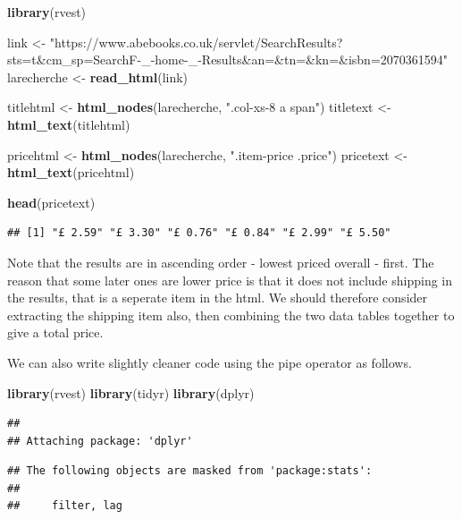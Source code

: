 \documentclass[]{book}
\newenvironment{Shaded}{\begin{snugshade}}{\end{snugshade}}
\newcommand{\KeywordTok}[1]{\textcolor[rgb]{0.13,0.29,0.53}{\textbf{#1}}}
\newcommand{\StringTok}[1]{\textcolor[rgb]{0.31,0.60,0.02}{#1}}
\newcommand{\NormalTok}[1]{#1}
\theoremstyle{definition}
\theoremstyle{definition}
\theoremstyle{definition}
\theoremstyle{remark}
\begin{document}
\begin{Shaded}
\begin{Highlighting}[]
\KeywordTok{library}\NormalTok{(rvest)}

\NormalTok{link <-}\StringTok{ "https://www.abebooks.co.uk/servlet/SearchResults?sts=t&cm_sp=SearchF-_-home-_-Results&an=&tn=&kn=&isbn=2070361594"}
\NormalTok{larecherche <-}\StringTok{ }\KeywordTok{read_html}\NormalTok{(link)}

\NormalTok{titlehtml <-}\StringTok{ }\KeywordTok{html_nodes}\NormalTok{(larecherche, }\StringTok{".col-xs-8 a span"}\NormalTok{)}
\NormalTok{titletext <-}\StringTok{ }\KeywordTok{html_text}\NormalTok{(titlehtml)}

\NormalTok{pricehtml <-}\StringTok{ }\KeywordTok{html_nodes}\NormalTok{(larecherche, }\StringTok{".item-price .price"}\NormalTok{)}
\NormalTok{pricetext <-}\StringTok{ }\KeywordTok{html_text}\NormalTok{(pricehtml)}

\KeywordTok{head}\NormalTok{(pricetext)}
\end{Highlighting}
\end{Shaded}

\begin{verbatim}
## [1] "£ 2.59" "£ 3.30" "£ 0.76" "£ 0.84" "£ 2.99" "£ 5.50"
\end{verbatim}

Note that the results are in ascending order - lowest priced overall -
first. The reason that some later ones are lower price is that it does
not include shipping in the results, that is a seperate item in the
html. We should therefore consider extracting the shipping item also,
then combining the two data tables together to give a total price.

We can also write slightly cleaner code using the pipe operator as
follows.

\begin{Shaded}
\begin{Highlighting}[]
\KeywordTok{library}\NormalTok{(rvest)}
\KeywordTok{library}\NormalTok{(tidyr)}
\KeywordTok{library}\NormalTok{(dplyr)}
\end{Highlighting}
\end{Shaded}

\begin{verbatim}
## 
## Attaching package: 'dplyr'
\end{verbatim}

\begin{verbatim}
## The following objects are masked from 'package:stats':
## 
##     filter, lag
\end{verbatim}
\end{document}
